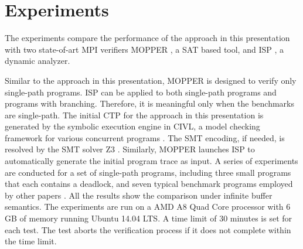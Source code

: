 \section{Experiments}
The experiments compare the performance of the approach in this presentation with two state-of-art MPI verifiers MOPPER \cite{DBLP:conf/fm/ForejtKNS14}, a SAT based tool, and ISP \cite{DBLP:conf/ppopp/VakkalankaSGK08,DBLP:conf/sbmf/SharmaGB12}, a dynamic analyzer. 

Similar to the approach in this presentation, MOPPER is designed to verify only single-path programs. ISP can be applied to both single-path programs and programs with branching. Therefore, it is meaningful only when the benchmarks are single-path. The initial CTP for the approach in this presentation is generated by the symbolic execution engine in CIVL, a model checking framework for various concurrent programs \cite{siegelDGLRTZZ:2014:civl-tr,zirkel-siegel-rossi:2014:accuracy-tr}. The SMT encoding, if needed, is resolved by the SMT solver Z3 \cite{demoura:tacas08}. Similarly, MOPPER launches ISP to automatically generate the initial program trace as input.
A series of experiments are conducted for a set of single-path programs, including three small programs \cite{DBLP:conf/fm/ForejtKNS14} that each contains a deadlock, and seven typical benchmark programs employed by other papers \cite{benchmark:mentoCarlo, benchmark:fevs, DBLP:conf/ppopp/XueLWGCZZV09}. All the results show the comparison under infinite buffer semantics.  
The experiments are run on a AMD A8 Quad Core processor with 6 GB of memory running Ubuntu 14.04 LTS. A time limit of 30 minutes is set for each test. The test aborts the verification process if it does not complete within the time limit. 



